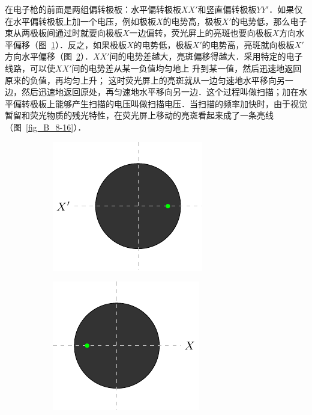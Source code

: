 在电子枪的前面是两组偏转极板：水平偏转极板$XX'$和竖直偏转极板$YY'$．如果仅在水平偏转极板上加一个电压，例如极板$X$的电势高，极板$X'$的电势低，那么电子束从两极板间通过时就要向极板$X$一边偏转，荧光屏上的亮斑也要向极板$X$方向水平偏移（图~\ref{fig_B_8-15a}）．反之，如果极板$X$的电势低，极板$X'$的电势高，亮斑就向极板$X'$方向水平偏移（图~\ref{fig_B_8-15b}）．$XX'$间的电势差越大，亮斑偏移得越大．采用特定的电子线路，可以使$XX'$间的电势差从某一负值均匀地上
升到某一值，然后迅速地返回原来的负值，再均匀上升；
这时荧光屏上的亮斑就从一边匀速地水平移向另一边，然后迅速地返回原处，再匀速地水平移向另一边．这个过程叫做扫描；加在水平偏转极板上能够产生扫描的电压叫做扫描电压．当扫描的频率加快时，由于视觉暂留和荧光物质的残光特性，在荧光屏上移动的亮斑看起来成了一条亮线（图~\ref{fig_B_8-16}）．
\begin{figure}[htbp]
    \centering
    \begin{minipage}[b]{0.68\textwidth}
    \centering
    \begin{subfigure}{0.45\linewidth}
        \centering
        \includegraphics{fig/B/8-15a.pdf}
        \caption{}\label{fig_B_8-15a}
    \end{subfigure}
    \hfil
    \begin{subfigure}{0.45\linewidth}
        \centering
        \includegraphics{fig/B/8-15b.pdf}
        \caption{}\label{fig_B_8-15b}
    \end{subfigure}
    \caption{}\label{fig_B_8-15}
    \end{minipage}

\end{figure}

